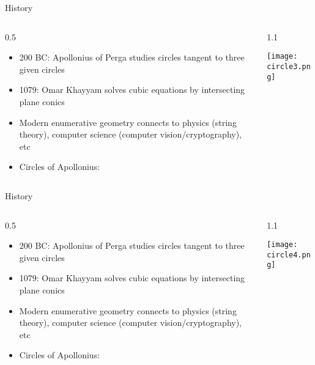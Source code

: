 \documentclass{beamer}
\theoremstyle{definition}
\begin{document}
                        \begin{frame}{History}

      \begin{columns}[c]
        \begin{column}{0.5\hsize}
      
          \begin{itemize}
          \item {\texttildelow}200 BC: Apollonius of Perga studies circles tangent to three
            given circles
          \item {\texttildelow}1079: Omar Khayyam solves cubic equations by intersecting
            plane conics
          \item Modern enumerative geometry connects to physics (string theory),
            computer science (computer vision/cryptography), etc
            \item Circles of Apollonius:
          \end{itemize}
        \end{column}
        \begin{column}{1.1\hsize}

            \texttt{[image: circle3.png]}

        \end{column}
      \end{columns}
                        \end{frame}

                                \begin{frame}{History}

      \begin{columns}[c]
        \begin{column}{0.5\hsize}
      
          \begin{itemize}
          \item {\texttildelow}200 BC: Apollonius of Perga studies circles tangent to three
            given circles
          \item {\texttildelow}1079: Omar Khayyam solves cubic equations by intersecting
            plane conics
          \item Modern enumerative geometry connects to physics (string theory),
            computer science (computer vision/cryptography), etc
            \item Circles of Apollonius:
          \end{itemize}
        \end{column}
        \begin{column}{1.1\hsize}

            \texttt{[image: circle4.png]}

        \end{column}
      \end{columns}
                                \end{frame}
\end{document}
